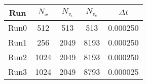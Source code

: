 \begin{table}[H]
	\centering
	\begin{tabular}{|c|c|c|c|c|} \hline
	Run & $N_x$ & $N_{v_i}$ & $N_{v_e}$ & $\Delta t$ \\ 
	\hline \hline 
	Run0 & 512 & 513 & 513 & 0.000250 \\ \hline 
	Run1 & 256 & 2049 & 8193 & 0.000250 \\ \hline 
	Run2 & 1024 & 2049 & 8193 & 0.000250 \\ \hline 
	Run3 & 1024 & 2049 & 8793 & 0.000025 \\ \hline 
	\end{tabular}
	\label{tab:runs}
\end{table}
